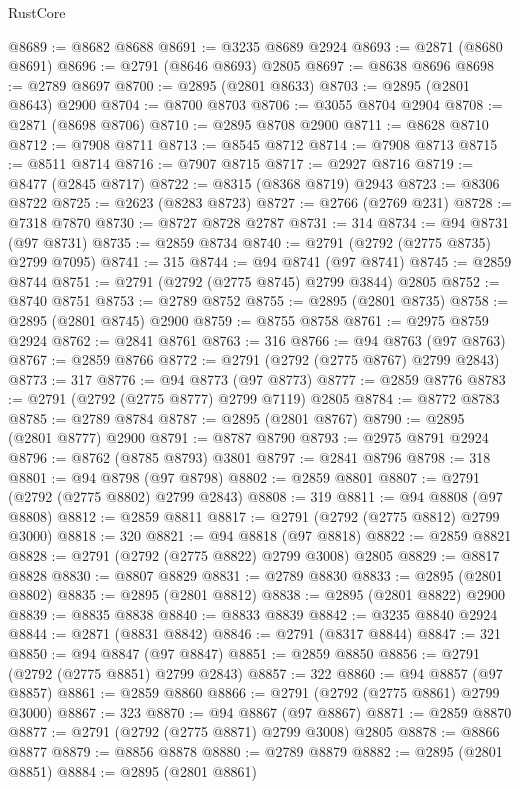 \begin{lexlean}{RustCore}
\begin{coremodule}
@8689 := @8682 @8688
@8691 := @3235 @8689 @2924
@8693 := @2871 (@8680 @8691)
@8696 := @2791 (@8646 @8693) @2805
@8697 := @8638 @8696
@8698 := @2789 @8697
@8700 := @2895 (@2801 @8633)
@8703 := @2895 (@2801 @8643) @2900
@8704 := @8700 @8703
@8706 := @3055 @8704 @2904
@8708 := @2871 (@8698 @8706)
@8710 := @2895 @8708 @2900
@8711 := @8628 @8710
@8712 := @7908 @8711
@8713 := @8545 @8712
@8714 := @7908 @8713
@8715 := @8511 @8714
@8716 := @7907 @8715
@8717 := @2927 @8716
@8719 := @8477 (@2845 @8717)
@8722 := @8315 (@8368 @8719) @2943
@8723 := @8306 @8722
@8725 := @2623 (@8283 @8723)
@8727 := @2766 (@2769 @231)
@8728 := @7318 @7870
@8730 := @8727 @8728 @2787
@8731 := 314
@8734 := @94 @8731 (@97 @8731)
@8735 := @2859 @8734
@8740 := @2791 (@2792 (@2775 @8735) @2799 @7095)
@8741 := 315
@8744 := @94 @8741 (@97 @8741)
@8745 := @2859 @8744
@8751 := @2791 (@2792 (@2775 @8745) @2799 @3844) @2805
@8752 := @8740 @8751
@8753 := @2789 @8752
@8755 := @2895 (@2801 @8735)
@8758 := @2895 (@2801 @8745) @2900
@8759 := @8755 @8758
@8761 := @2975 @8759 @2924
@8762 := @2841 @8761
@8763 := 316
@8766 := @94 @8763 (@97 @8763)
@8767 := @2859 @8766
@8772 := @2791 (@2792 (@2775 @8767) @2799 @2843)
@8773 := 317
@8776 := @94 @8773 (@97 @8773)
@8777 := @2859 @8776
@8783 := @2791 (@2792 (@2775 @8777) @2799 @7119) @2805
@8784 := @8772 @8783
@8785 := @2789 @8784
@8787 := @2895 (@2801 @8767)
@8790 := @2895 (@2801 @8777) @2900
@8791 := @8787 @8790
@8793 := @2975 @8791 @2924
@8796 := @8762 (@8785 @8793) @3801
@8797 := @2841 @8796
@8798 := 318
@8801 := @94 @8798 (@97 @8798)
@8802 := @2859 @8801
@8807 := @2791 (@2792 (@2775 @8802) @2799 @2843)
@8808 := 319
@8811 := @94 @8808 (@97 @8808)
@8812 := @2859 @8811
@8817 := @2791 (@2792 (@2775 @8812) @2799 @3000)
@8818 := 320
@8821 := @94 @8818 (@97 @8818)
@8822 := @2859 @8821
@8828 := @2791 (@2792 (@2775 @8822) @2799 @3008) @2805
@8829 := @8817 @8828
@8830 := @8807 @8829
@8831 := @2789 @8830
@8833 := @2895 (@2801 @8802)
@8835 := @2895 (@2801 @8812)
@8838 := @2895 (@2801 @8822) @2900
@8839 := @8835 @8838
@8840 := @8833 @8839
@8842 := @3235 @8840 @2924
@8844 := @2871 (@8831 @8842)
@8846 := @2791 (@8317 @8844)
@8847 := 321
@8850 := @94 @8847 (@97 @8847)
@8851 := @2859 @8850
@8856 := @2791 (@2792 (@2775 @8851) @2799 @2843)
@8857 := 322
@8860 := @94 @8857 (@97 @8857)
@8861 := @2859 @8860
@8866 := @2791 (@2792 (@2775 @8861) @2799 @3000)
@8867 := 323
@8870 := @94 @8867 (@97 @8867)
@8871 := @2859 @8870
@8877 := @2791 (@2792 (@2775 @8871) @2799 @3008) @2805
@8878 := @8866 @8877
@8879 := @8856 @8878
@8880 := @2789 @8879
@8882 := @2895 (@2801 @8851)
@8884 := @2895 (@2801 @8861)

\end{coremodule}
\end{lexlean}
